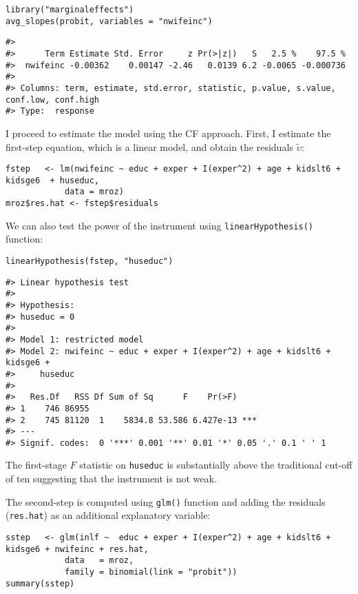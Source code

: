 \begin{verbatim}
library("marginaleffects")
avg_slopes(probit, variables = "nwifeinc")
\end{verbatim}

\begin{verbatim}
#> 
#>      Term Estimate Std. Error     z Pr(>|z|)   S   2.5 %    97.5 %
#>  nwifeinc -0.00362    0.00147 -2.46   0.0139 6.2 -0.0065 -0.000736
#> 
#> Columns: term, estimate, std.error, statistic, p.value, s.value, conf.low, conf.high 
#> Type:  response
\end{verbatim}

I proceed to estimate the model using the CF approach. First, I estimate the first-step equation, which is a linear model, and obtain the residuals \(\widetilde{\upsilon}\):

\begin{verbatim}
fstep   <- lm(nwifeinc ~ educ + exper + I(exper^2) + age + kidslt6 + kidsge6  + huseduc, 
            data = mroz)
mroz$res.hat <- fstep$residuals
\end{verbatim}

We can also test the power of the instrument using \texttt{linearHypothesis()} function:

\begin{verbatim}
linearHypothesis(fstep, "huseduc")
\end{verbatim}

\begin{verbatim}
#> Linear hypothesis test
#> 
#> Hypothesis:
#> huseduc = 0
#> 
#> Model 1: restricted model
#> Model 2: nwifeinc ~ educ + exper + I(exper^2) + age + kidslt6 + kidsge6 + 
#>     huseduc
#> 
#>   Res.Df   RSS Df Sum of Sq      F    Pr(>F)    
#> 1    746 86955                                  
#> 2    745 81120  1    5834.8 53.586 6.427e-13 ***
#> ---
#> Signif. codes:  0 '***' 0.001 '**' 0.01 '*' 0.05 '.' 0.1 ' ' 1
\end{verbatim}

The first-stage \(F\) statistic on \texttt{huseduc} is substantially above the traditional cut-off of ten suggesting that the instrument is not weak.

The second-step is computed using \texttt{glm()} function and adding the residuals (\texttt{res.hat}) as an additional explanatory variable:

\begin{verbatim}
sstep   <- glm(inlf ~  educ + exper + I(exper^2) + age + kidslt6 + kidsge6 + nwifeinc + res.hat, 
            data   = mroz, 
            family = binomial(link = "probit")) 
summary(sstep)
\end{verbatim}

